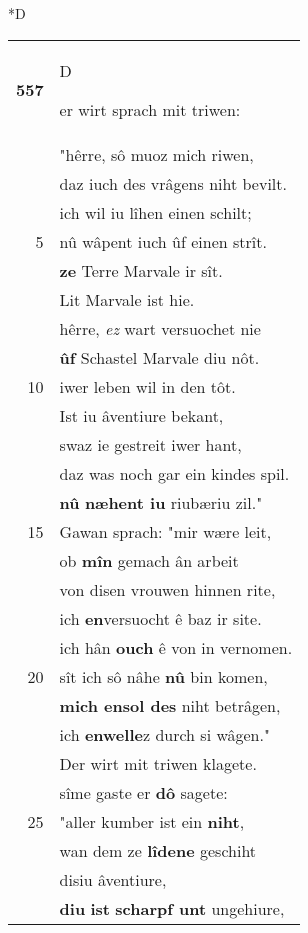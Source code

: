 \documentclass[8pt,a4paper,notitlepage]{article}
\begin{document}
\begin{table}[ht]
\begin{minipage}[t]{0.5\linewidth}
\small
\begin{center}*D
\end{center}
\begin{tabular}{rl}
\textbf{557} & \begin{large}D\end{large}er wirt sprach mit triwen:\\ 
 & "hêrre, sô muoz mich riwen,\\ 
 & daz iuch des vrâgens niht bevilt.\\ 
 & ich wil iu lîhen einen schilt;\\ 
5 & nû wâpent iuch ûf einen strît.\\ 
 & \textbf{ze} Terre Marvale ir sît.\\ 
 & Lit Marvale ist hie.\\ 
 & hêrre, \textit{ez} wart versuochet nie\\ 
 & \textbf{ûf} Schastel Marvale diu nôt.\\ 
10 & iwer leben wil in den tôt.\\ 
 & Ist iu âventiure bekant,\\ 
 & swaz ie gestreit iwer hant,\\ 
 & daz was noch gar ein kindes spil.\\ 
 & \textbf{nû} \textbf{næhent iu} riubæriu zil."\\ 
15 & Gawan sprach: "mir wære leit,\\ 
 & ob \textbf{mîn} gemach ân arbeit\\ 
 & von disen vrouwen hinnen rite,\\ 
 & ich \textbf{en}versuocht ê baz ir site.\\ 
 & ich hân \textbf{ouch} ê von in vernomen.\\ 
20 & sît ich sô nâhe \textbf{nû} bin komen,\\ 
 & \textbf{mich ensol des} niht betrâgen,\\ 
 & ich \textbf{en}\textbf{welle}z durch si wâgen."\\ 
 & Der wirt mit triwen klagete.\\ 
 & sîme gaste er \textbf{dô} sagete:\\ 
25 & "aller kumber ist ein \textbf{niht},\\ 
 & wan dem ze \textbf{lîdene} geschiht\\ 
 & disiu âventiure,\\ 
 & \textbf{diu} \textbf{ist} \textbf{scharpf unt} ungehiure,\\ 

\end{tabular}
\end{minipage}
\end{table}
\end{document}
